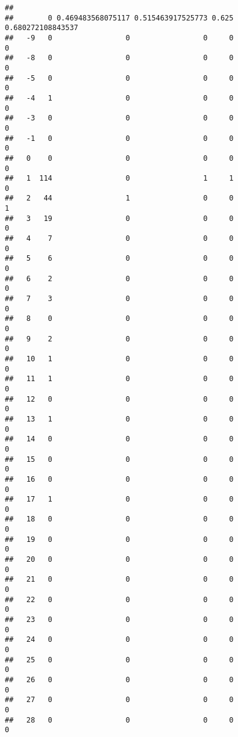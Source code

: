 \documentclass[]{article}
\begin{document}
\begin{verbatim}
##     
##        0 0.469483568075117 0.515463917525773 0.625 0.680272108843537
##   -9   0                 0                 0     0                 0
##   -8   0                 0                 0     0                 0
##   -5   0                 0                 0     0                 0
##   -4   1                 0                 0     0                 0
##   -3   0                 0                 0     0                 0
##   -1   0                 0                 0     0                 0
##   0    0                 0                 0     0                 0
##   1  114                 0                 1     1                 0
##   2   44                 1                 0     0                 1
##   3   19                 0                 0     0                 0
##   4    7                 0                 0     0                 0
##   5    6                 0                 0     0                 0
##   6    2                 0                 0     0                 0
##   7    3                 0                 0     0                 0
##   8    0                 0                 0     0                 0
##   9    2                 0                 0     0                 0
##   10   1                 0                 0     0                 0
##   11   1                 0                 0     0                 0
##   12   0                 0                 0     0                 0
##   13   1                 0                 0     0                 0
##   14   0                 0                 0     0                 0
##   15   0                 0                 0     0                 0
##   16   0                 0                 0     0                 0
##   17   1                 0                 0     0                 0
##   18   0                 0                 0     0                 0
##   19   0                 0                 0     0                 0
##   20   0                 0                 0     0                 0
##   21   0                 0                 0     0                 0
##   22   0                 0                 0     0                 0
##   23   0                 0                 0     0                 0
##   24   0                 0                 0     0                 0
##   25   0                 0                 0     0                 0
##   26   0                 0                 0     0                 0
##   27   0                 0                 0     0                 0
##   28   0                 0                 0     0                 0

\end{verbatim}
\end{document}
